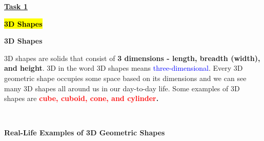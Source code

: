 \documentclass[12pt a4paper]{article}
\begin{document}
\begin{center}
\begin{Huge}
\textbf{\uline{Task 1}}
\end{Huge}
\thispagestyle{empty}
\end{center}


\newpage

    
\begin{center}
\begin{Huge}
\hl{\textbf{3D Shapes}}
\end{Huge}
\end{center}

\thispagestyle{empty}

\newpage
\clearpage


\begin{Huge}
\noindent
\textbf{3D Shapes} \\
\end{Huge}

\begin{huge}
\noindent \LARGE
3D shapes are solids that consist of \textbf{3 dimensions - length, breadth (width), and height}. 3D in the word 3D shapes means \textcolor{blue}{three-dimensional}. Every 3D geometric shape occupies some space based on its dimensions and we can see many 3D shapes all around us in our day-to-day life. Some examples of 3D shapes are \textbf{\textcolor{red}{cube, cuboid, cone, and cylinder}.}
\end{huge} \\

\begin{huge}
\noindent
\Large\textbf{Real-Life Examples of 3D Geometric Shapes}\\
\end{huge} \\
\end{document}
